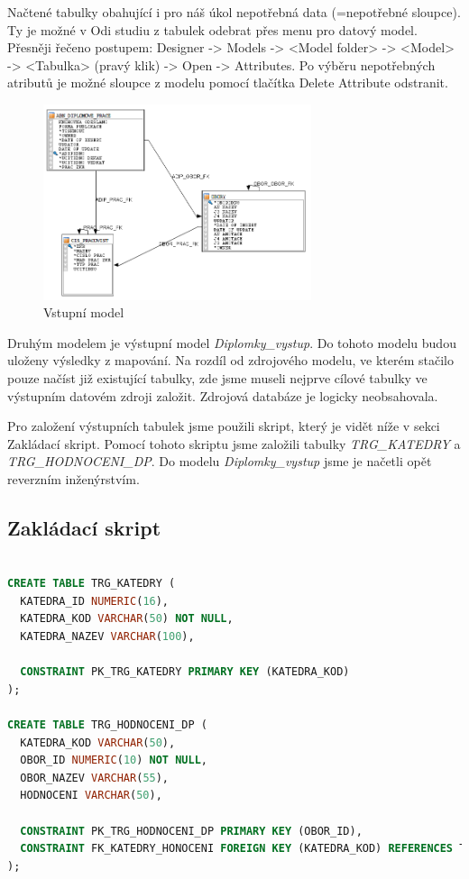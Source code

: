 Načtené tabulky obahující i pro náš úkol nepotřebná data (=nepotřebné sloupce). Ty je možné v Odi studiu z tabulek odebrat přes menu pro datový model. Přesněji řečeno postupem: Designer -> Models -> <Model folder> -> <Model> -> <Tabulka> (pravý klik) -> Open -> Attributes.
Po výběru nepotřebných atributů je možné sloupce z modelu pomocí tlačítka Delete Attribute odstranit. 

\begin{figure}[htb]
    \centering
    \includegraphics[width=0.7\textwidth]{graphs/src-model.png}
    \caption{Vstupní model}
    \label{fig:src-model}
\end{figure}
\FloatBarrier

Druhým modelem je výstupní model \textit{Diplomky\_vystup}. Do tohoto modelu budou uloženy výsledky z mapování. Na rozdíl od zdrojového modelu, ve kterém stačilo pouze načíst již existující tabulky, zde jsme museli nejprve cílové tabulky ve výstupním datovém zdroji založit. Zdrojová databáze je logicky neobsahovala. 

Pro založení výstupních tabulek jsme použili skript, který je vidět níže v sekci Zakládací skript. Pomocí tohoto skriptu jsme založili tabulky \textit{TRG\_KATEDRY} a \textit{TRG\_HODNOCENI\_DP}. Do modelu \textit{Diplomky\_vystup} jsme je načetli opět reverzním inženýrstvím.  

\subsection{Zakládací skript}
\begin{lstlisting}[language=sql]

CREATE TABLE TRG_KATEDRY (
  KATEDRA_ID NUMERIC(16),
  KATEDRA_KOD VARCHAR(50) NOT NULL,
  KATEDRA_NAZEV VARCHAR(100),

  CONSTRAINT PK_TRG_KATEDRY PRIMARY KEY (KATEDRA_KOD)
);

CREATE TABLE TRG_HODNOCENI_DP (
  KATEDRA_KOD VARCHAR(50),
  OBOR_ID NUMERIC(10) NOT NULL,
  OBOR_NAZEV VARCHAR(55),
  HODNOCENI VARCHAR(50),

  CONSTRAINT PK_TRG_HODNOCENI_DP PRIMARY KEY (OBOR_ID),
  CONSTRAINT FK_KATEDRY_HONOCENI FOREIGN KEY (KATEDRA_KOD) REFERENCES TRG_KATEDRY (KATEDRA_KOD)
);
\end{lstlisting}


